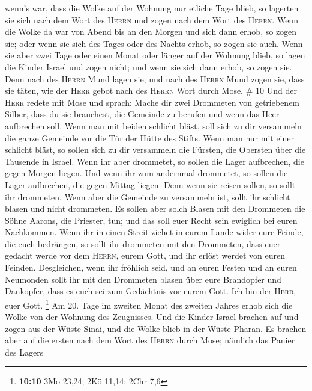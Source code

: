 wenn's war, dass die Wolke auf der Wohnung nur etliche Tage blieb, so
lagerten sie sich nach dem Wort des \textsc{Herrn} und zogen nach dem
Wort des \textsc{Herrn}.  Wenn die Wolke da war von Abend
bis an den Morgen und sich dann erhob, so zogen sie; oder wenn sie sich
des Tages oder des Nachts erhob, so zogen sie auch.  Wenn
sie aber zwei Tage oder einen Monat oder länger auf der Wohnung blieb,
so lagen die Kinder Israel und zogen nicht; und wenn sie sich dann
erhob, so zogen sie.  Denn nach des \textsc{Herrn} Mund
lagen sie, und nach des \textsc{Herrn} Mund zogen sie, dass sie täten,
wie der \textsc{Herr} gebot nach des \textsc{Herrn} Wort durch Mose. \#
10  Und der \textsc{Herr} redete mit Mose und sprach:
 Mache dir zwei Drommeten von getriebenem Silber, dass du
sie brauchest, die Gemeinde zu berufen und wenn das Heer aufbrechen
soll.  Wenn man mit beiden schlicht bläst, soll sich zu
dir versammeln die ganze Gemeinde vor die Tür der Hütte des Stifts.
 Wenn man nur mit einer schlicht bläst, so sollen sich zu
dir versammeln die Fürsten, die Obersten über die Tausende in Israel.
 Wenn ihr aber drommetet, so sollen die Lager aufbrechen,
die gegen Morgen liegen.  Und wenn ihr zum andernmal
drommetet, so sollen die Lager aufbrechen, die gegen Mittag liegen. Denn
wenn sie reisen sollen, so sollt ihr drommeten.  Wenn aber
die Gemeinde zu versammeln ist, sollt ihr schlicht blasen und nicht
drommeten.  Es sollen aber solch Blasen mit den Drommeten
die Söhne Aarons, die Priester, tun; und das soll euer Recht sein
ewiglich bei euren Nachkommen.  Wenn ihr in einen Streit
ziehet in eurem Lande wider eure Feinde, die euch bedrängen, so sollt
ihr drommeten mit den Drommeten, dass euer gedacht werde vor dem
\textsc{Herrn}, eurem Gott, und ihr erlöst werdet von euren Feinden.
 Desgleichen, wenn ihr fröhlich seid, und an euren Festen
und an euren Neumonden sollt ihr mit den Drommeten blasen über eure
Brandopfer und Dankopfer, dass es euch sei zum Gedächtnis vor eurem
Gott. Ich bin der \textsc{Herr}, euer Gott. \footnote{\textbf{10:10} 3Mo
  23,24; 2Kö 11,14; 2Chr 7,6}  Am 20. Tage im zweiten
Monat des zweiten Jahres erhob sich die Wolke von der Wohnung des
Zeugnisses.  Und die Kinder Israel brachen auf und zogen
aus der Wüste Sinai, und die Wolke blieb in der Wüste Pharan.
 Es brachen aber auf die ersten nach dem Wort des
\textsc{Herrn} durch Mose;  nämlich das Panier des Lagers
